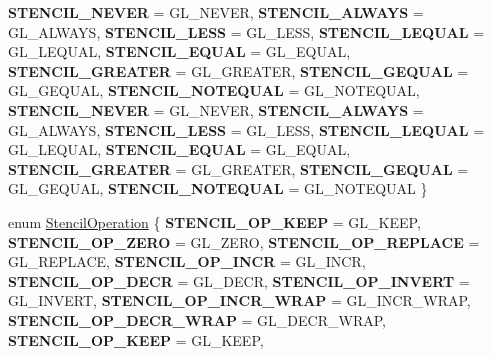 \begin{DoxyCompactItemize}
{\bfseries S\+T\+E\+N\+C\+I\+L\+\_\+\+N\+E\+V\+ER} = G\+L\+\_\+\+N\+E\+V\+ER, 
{\bfseries S\+T\+E\+N\+C\+I\+L\+\_\+\+A\+L\+W\+A\+YS} = G\+L\+\_\+\+A\+L\+W\+A\+YS, 
{\bfseries S\+T\+E\+N\+C\+I\+L\+\_\+\+L\+E\+SS} = G\+L\+\_\+\+L\+E\+SS, 
{\bfseries S\+T\+E\+N\+C\+I\+L\+\_\+\+L\+E\+Q\+U\+AL} = G\+L\+\_\+\+L\+E\+Q\+U\+AL, 
\newline
{\bfseries S\+T\+E\+N\+C\+I\+L\+\_\+\+E\+Q\+U\+AL} = G\+L\+\_\+\+E\+Q\+U\+AL, 
{\bfseries S\+T\+E\+N\+C\+I\+L\+\_\+\+G\+R\+E\+A\+T\+ER} = G\+L\+\_\+\+G\+R\+E\+A\+T\+ER, 
{\bfseries S\+T\+E\+N\+C\+I\+L\+\_\+\+G\+E\+Q\+U\+AL} = G\+L\+\_\+\+G\+E\+Q\+U\+AL, 
{\bfseries S\+T\+E\+N\+C\+I\+L\+\_\+\+N\+O\+T\+E\+Q\+U\+AL} = G\+L\+\_\+\+N\+O\+T\+E\+Q\+U\+AL, 
\newline
{\bfseries S\+T\+E\+N\+C\+I\+L\+\_\+\+N\+E\+V\+ER} = G\+L\+\_\+\+N\+E\+V\+ER, 
{\bfseries S\+T\+E\+N\+C\+I\+L\+\_\+\+A\+L\+W\+A\+YS} = G\+L\+\_\+\+A\+L\+W\+A\+YS, 
{\bfseries S\+T\+E\+N\+C\+I\+L\+\_\+\+L\+E\+SS} = G\+L\+\_\+\+L\+E\+SS, 
{\bfseries S\+T\+E\+N\+C\+I\+L\+\_\+\+L\+E\+Q\+U\+AL} = G\+L\+\_\+\+L\+E\+Q\+U\+AL, 
\newline
{\bfseries S\+T\+E\+N\+C\+I\+L\+\_\+\+E\+Q\+U\+AL} = G\+L\+\_\+\+E\+Q\+U\+AL, 
{\bfseries S\+T\+E\+N\+C\+I\+L\+\_\+\+G\+R\+E\+A\+T\+ER} = G\+L\+\_\+\+G\+R\+E\+A\+T\+ER, 
{\bfseries S\+T\+E\+N\+C\+I\+L\+\_\+\+G\+E\+Q\+U\+AL} = G\+L\+\_\+\+G\+E\+Q\+U\+AL, 
{\bfseries S\+T\+E\+N\+C\+I\+L\+\_\+\+N\+O\+T\+E\+Q\+U\+AL} = G\+L\+\_\+\+N\+O\+T\+E\+Q\+U\+AL
 \}
\item 
enum \hyperlink{classRenderState_a47a31ccd6ff5801cb0618df7e25f7f70}{Stencil\+Operation} \{ \newline
{\bfseries S\+T\+E\+N\+C\+I\+L\+\_\+\+O\+P\+\_\+\+K\+E\+EP} = G\+L\+\_\+\+K\+E\+EP, 
{\bfseries S\+T\+E\+N\+C\+I\+L\+\_\+\+O\+P\+\_\+\+Z\+E\+RO} = G\+L\+\_\+\+Z\+E\+RO, 
{\bfseries S\+T\+E\+N\+C\+I\+L\+\_\+\+O\+P\+\_\+\+R\+E\+P\+L\+A\+CE} = G\+L\+\_\+\+R\+E\+P\+L\+A\+CE, 
{\bfseries S\+T\+E\+N\+C\+I\+L\+\_\+\+O\+P\+\_\+\+I\+N\+CR} = G\+L\+\_\+\+I\+N\+CR, 
\newline
{\bfseries S\+T\+E\+N\+C\+I\+L\+\_\+\+O\+P\+\_\+\+D\+E\+CR} = G\+L\+\_\+\+D\+E\+CR, 
{\bfseries S\+T\+E\+N\+C\+I\+L\+\_\+\+O\+P\+\_\+\+I\+N\+V\+E\+RT} = G\+L\+\_\+\+I\+N\+V\+E\+RT, 
{\bfseries S\+T\+E\+N\+C\+I\+L\+\_\+\+O\+P\+\_\+\+I\+N\+C\+R\+\_\+\+W\+R\+AP} = G\+L\+\_\+\+I\+N\+C\+R\+\_\+\+W\+R\+AP, 
{\bfseries S\+T\+E\+N\+C\+I\+L\+\_\+\+O\+P\+\_\+\+D\+E\+C\+R\+\_\+\+W\+R\+AP} = G\+L\+\_\+\+D\+E\+C\+R\+\_\+\+W\+R\+AP, 
\newline
{\bfseries S\+T\+E\+N\+C\+I\+L\+\_\+\+O\+P\+\_\+\+K\+E\+EP} = G\+L\+\_\+\+K\+E\+EP, 

\end{DoxyCompactItemize}
